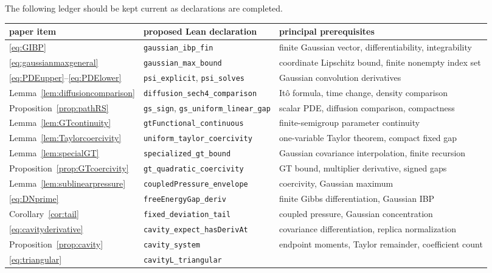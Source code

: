 \documentclass[11pt]{article}
\numberwithin{equation}{section}
\newcommand{\1}{\mathbf 1}
\begin{document}
The following ledger should be kept current as declarations are completed.
\begin{center}
\begin{tabular}{p{}p{}p{}}
\toprule
paper item & proposed Lean declaration & principal prerequisites\\
\midrule
\eqref{eq:GIBP} &
\texttt{gaussian\_ibp\_fin} &
finite Gaussian vector, differentiability, integrability\\
\eqref{eq:gaussianmaxgeneral} &
\texttt{gaussian\_max\_bound} &
coordinate Lipschitz bound, finite nonempty index set\\
\eqref{eq:PDEupper}--\eqref{eq:PDElower} &
\texttt{psi\_explicit}, \texttt{psi\_solves} &
Gaussian convolution derivatives\\
Lemma~\ref{lem:diffusioncomparison} &
\texttt{diffusion\_sech4\_comparison} &
It\^o formula, time change, density comparison\\
Proposition~\ref{prop:pathRS} &
\texttt{gs\_sign}, \texttt{gs\_uniform\_linear\_gap} &
scalar PDE, diffusion comparison, compactness\\
Lemma~\ref{lem:GTcontinuity} &
\texttt{gtFunctional\_continuous} &
finite-semigroup parameter continuity\\
Lemma~\ref{lem:Taylorcoercivity} &
\texttt{uniform\_taylor\_coercivity} &
one-variable Taylor theorem, compact fixed gap\\
Lemma~\ref{lem:specialGT} &
\texttt{specialized\_gt\_bound} &
Gaussian covariance interpolation, finite recursion\\
Proposition~\ref{prop:GTcoercivity} &
\texttt{gt\_quadratic\_coercivity} &
GT bound, multiplier derivative, signed gaps\\
Lemma~\ref{lem:sublinearpressure} &
\texttt{coupledPressure\_envelope} &
coercivity, Gaussian maximum\\
\eqref{eq:DNprime} &
\texttt{freeEnergyGap\_deriv} &
finite Gibbs differentiation, Gaussian IBP\\
Corollary~\ref{cor:tail} &
\texttt{fixed\_deviation\_tail} &
coupled pressure, Gaussian concentration\\
\eqref{eq:cavityderivative} &
\texttt{cavity\_expect\_hasDerivAt} &
covariance differentiation, replica normalization\\
Proposition~\ref{prop:cavity} &
\texttt{cavity\_system} &
endpoint moments, Taylor remainder, coefficient count\\
\eqref{eq:triangular} &
\texttt{cavityL\_triangular} &

\end{tabular}
\end{center}
\end{document}
